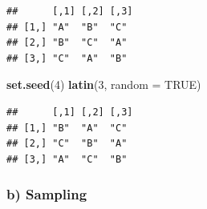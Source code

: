 \documentclass[
]{article}
\newenvironment{Shaded}{\begin{snugshade}}{\end{snugshade}}
\newcommand{\AttributeTok}[1]{\textcolor[rgb]{0.13,0.29,0.53}{#1}}
\newcommand{\ConstantTok}[1]{\textcolor[rgb]{0.56,0.35,0.01}{#1}}
\newcommand{\DecValTok}[1]{\textcolor[rgb]{0.00,0.00,0.81}{#1}}
\newcommand{\FunctionTok}[1]{\textcolor[rgb]{0.13,0.29,0.53}{\textbf{#1}}}
\newcommand{\NormalTok}[1]{#1}
\begin{document}
\begin{verbatim}
##      [,1] [,2] [,3]
## [1,] "A"  "B"  "C" 
## [2,] "B"  "C"  "A" 
## [3,] "C"  "A"  "B"
\end{verbatim}

\begin{Shaded}
\begin{Highlighting}[]
\FunctionTok{set.seed}\NormalTok{(}\DecValTok{4}\NormalTok{)}
\FunctionTok{latin}\NormalTok{(}\DecValTok{3}\NormalTok{, }\AttributeTok{random =} \ConstantTok{TRUE}\NormalTok{)}
\end{Highlighting}
\end{Shaded}

\begin{verbatim}
##      [,1] [,2] [,3]
## [1,] "B"  "A"  "C" 
## [2,] "C"  "B"  "A" 
## [3,] "A"  "C"  "B"
\end{verbatim}

\subsubsection{b) Sampling}\label{b-sampling}
\end{document}
